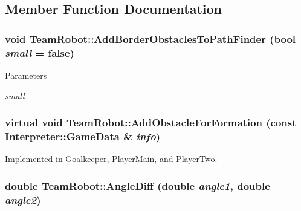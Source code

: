 \subsection{Member Function Documentation}
\hypertarget{classTeamRobot_acf4c435c98bc406744a12cd140d6631d}{
\subsubsection[{AddBorderObstaclesToPathFinder}]{\setlength{\rightskip}{0pt plus 5cm}void TeamRobot::AddBorderObstaclesToPathFinder (bool {\em small} = {\ttfamily false})}}
\label{classTeamRobot_acf4c435c98bc406744a12cd140d6631d}

\begin{DoxyParams}{Parameters}
\item[{\em small}]\end{DoxyParams}
\hypertarget{classTeamRobot_a71ec65db46db1ac511fe17b668d4f192}{
\subsubsection[{AddObstacleForFormation}]{\setlength{\rightskip}{0pt plus 5cm}virtual void TeamRobot::AddObstacleForFormation (const {\bf Interpreter::GameData} \& {\em info})}}
\label{classTeamRobot_a71ec65db46db1ac511fe17b668d4f192}


Implemented in \hyperlink{classGoalkeeper_a5287a2e74795bbec8f0ead767655da5d}{Goalkeeper}, \hyperlink{classPlayerMain_a978b3ce16f5d8e5d1cb9ef70f387227e}{PlayerMain}, and \hyperlink{classPlayerTwo_a9e3341541658f54a2dfb0491a774b4d4}{PlayerTwo}.

\hypertarget{classTeamRobot_a45d5d631b1e1e28c9c0f4ecbd47fdbde}{
\subsubsection[{AngleDiff}]{\setlength{\rightskip}{0pt plus 5cm}double TeamRobot::AngleDiff (double {\em angle1}, \/  double {\em angle2})}}
\label{classTeamRobot_a45d5d631b1e1e28c9c0f4ecbd47fdbde}

